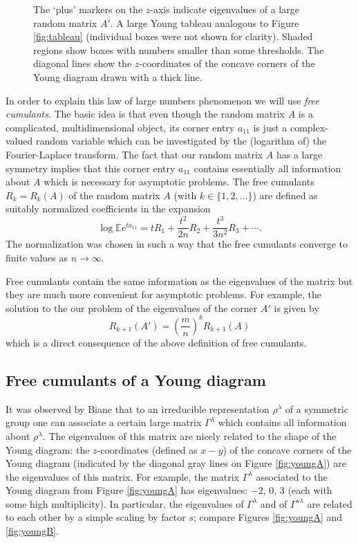 \documentclass{emsprocart}
\theoremstyle{definition}
\begin{document}
\begin{figure}[t]
\begin{tikzpicture}[scale=0.055]
\end{tikzpicture}
\caption{The `plus' markers on the $z$-axis indicate eigenvalues of a large random matrix $A'$.
A large Young tableau analogous to Figure \ref{fig:tableau}  (individual boxes were not shown for clarity). Shaded regions show boxes with numbers smaller than some thresholds.
The diagonal lines show the $z$-coordinates of the concave corners of the Young diagram
drawn with a thick line.}
\label{figure:law-of-large}
\end{figure}

In order to explain this law of large numbers phenomenon 
we will use  \emph{free cumulants}. 
The basic idea is that
even though the random matrix $A$ is a complicated, multidimensional object, its corner entry $a_{11}$ is just
a complex-valued random variable which can be investigated by the (logarithm of) the Fourier-Laplace transform.
The fact that our random matrix $A$ has a large symmetry 
implies that this corner entry $a_{11}$ contains essentially all information
about $A$ which is necessary for asymptotic problems. 
The free cumulants
$R_k=R_k(A)$ of the random matrix $A$ (with $k\in\{1,2,\dots\}$) are defined as suitably normalized 
coefficients in the expansion 
$$ \log {\mathbb{E}} e^{t a_{11}} = t R_1 + \frac{t^2}{2 n} R_2 + \frac{t^3}{3 n^2} R_3 + \cdots.$$
The normalization was chosen in such a way that the free cumulants converge to finite values as $n\to\infty$.

Free cumulants contain the same information as the eigenvalues of the matrix but they are much more 
convenient for asymptotic problems. 
For example, the solution to the our problem of the eigenvalues of the corner $A'$ is given by 
\begin{equation}
\label{eq:random-matrix}
 R_{k+1}(A') = \left(\frac{m}{n}\right)^{k} R_{k+1}(A) 
\end{equation}
which is a direct consequence of the above definition of free cumulants.

\subsection{Free cumulants of a Young diagram}

It was observed by Biane that to an irreducible representation $\rho^\lambda$ of a symmetric group
one can associate a certain large matrix $\Gamma^\lambda$
which contains all information about $\rho^\lambda$.
The eigenvalues of this matrix are nicely related to the shape of the Young diagram: 
the $z$-coordinates (defined as $x-y$) of the concave corners of the 
Young diagram (indicated by the diagonal gray lines on Figure \ref{fig:youngA}) are the eigenvalues of this matrix.
For example, the matrix $\Gamma^\lambda$ 
associated to the Young diagram from Figure \ref{fig:youngA} has eigenvalues: $-2$, $0$, $3$
(each with some high multiplicity).
In particular, the eigenvalues of $\Gamma^{\lambda}$ and of $\Gamma^{s\lambda}$ are related to
each other by a simple scaling by factor $s$; compare Figures \ref{fig:youngA} and \ref{fig:youngB}.
\end{document}
